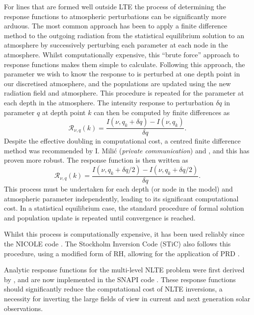 For lines that are formed well outside LTE the process of determining the response functions to atmospheric perturbations can be significantly more arduous.
The most common approach has been to apply a finite difference method to the outgoing radiation from the statistical equilibrium solution to an atmosphere by successively perturbing each parameter at each node in the atmosphere.
Whilst computationally expensive, this ``brute force'' approach to response functions makes them simple to calculate.
Following this approach, the parameter we wish to know the response to is perturbed at one depth point in our discretised atmosphere, and the populations are updated using the new radiation field and atmosphere.
This procedure is repeated for the parameter at each depth in the atmosphere.
The intensity response to perturbation $\delta q$ in parameter $q$ at depth point $k$ can then be computed by finite differences as
\begin{equation}
    \mathcal{R}_{\nu, q}(k) = \frac{I(\nu, q_k + \delta q) - I(\nu, q_k)}{\delta q}.
\end{equation}
Despite the effective doubling in computational cost, a centred finite difference method was recommended by I. Mili\'{c} (\emph{private communication}) and \citet{DelaCruzRodriguez2017}, and this has proven more robust.
The response function is then written as
\begin{equation}
    \mathcal{R}_{\nu, q}(k) = \frac{I(\nu, q_k + \delta q / 2) - I(\nu, q_k + \delta q / 2)}{\delta q}.
\end{equation}
This process must be undertaken for each depth (or node in the model) and atmospheric parameter independently, leading to its significant computational cost.
In a statistical equilibrium case, the standard procedure of formal solution and population update is repeated until convergence is reached.

Whilst this process is computationally expensive, it has been used reliably since the NICOLE code \citep[developed from \citet{SocasNavarro2000} but no longer using fixed departure coefficients]{Socas-Navarro2015}.
The Stockholm Inversion Code (STiC) also follows this procedure, using a modified form of RH, allowing for the application of PRD \citep{2019dlcr}.

Analytic response functions for the multi-level NLTE problem were first derived by \citet{Milic2017}, and are now implemented in the SNAPI code \citep{Milic2018}.
These response functions should significantly reduce the computational cost of NLTE inversions, a necessity for inverting the large fields of view in current and next generation solar observations.


